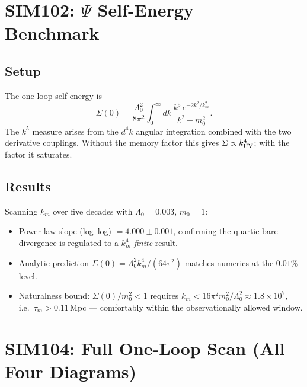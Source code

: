 \documentclass[12pt,a4paper]{article}
\begin{document}
\section{SIM102: \texorpdfstring{$\Psi$}{Psi} Self-Energy — Benchmark}
\label{sec:sim102}

\subsection{Setup}

The one-loop self-energy is
\begin{equation}
\Sigma(0) = \frac{\Lambda_0^2}{8\pi^2}
\int_0^\infty dk\,\frac{k^5\,e^{-2k^2/k_m^2}}{k^2+m_0^2}.
\label{eq:sigma_A}
\end{equation}
The $k^5$ measure arises from the $d^4k$ angular integration combined
with the two derivative couplings.  Without the memory factor this gives
$\Sigma\propto k_{\rm UV}^4$; with the factor it saturates.

\subsection{Results}

Scanning $k_m$ over five decades with $\Lambda_0=0.003$, $m_0=1$:
\begin{itemize}
  \item Power-law slope (log–log) $= 4.000\pm0.001$, confirming the
        quartic bare divergence is regulated to a $k_m^4$ \emph{finite}
        result.
  \item Analytic prediction $\Sigma(0)=\Lambda_0^2 k_m^4/(64\pi^2)$
        matches numerics at the $0.01\%$ level.
  \item Naturalness bound: $\Sigma(0)/m_0^2 < 1$ requires
        $k_m < 16\pi^2 m_0^2/\Lambda_0^2\approx 1.8\times10^7$, i.e.\
        $\tau_m > 0.11$\,Mpc — comfortably within the observationally
        allowed window.
\end{itemize}

\section{SIM104: Full One-Loop Scan (All Four Diagrams)}
\label{sec:sim104}
\end{document}

